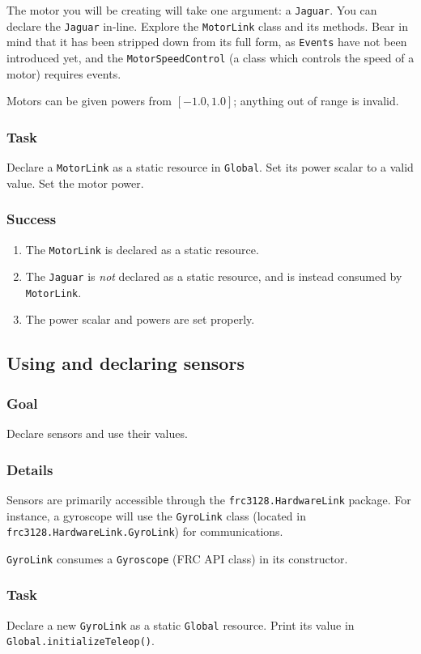 \documentclass[a4paper]{article}
\begin{document}
The motor you will be creating will take one argument: a \lstinline{Jaguar}. You can declare the \lstinline{Jaguar} in-line. Explore the \lstinline{MotorLink} class and its methods. Bear in mind that it has been stripped down from its full form, as \lstinline{Events} have not been introduced yet, and the \lstinline{MotorSpeedControl} (a class which controls the speed of a motor) requires events.

Motors can be given powers from $[-1.0,1.0]$; anything out of range is invalid.
\subsubsection{Task} Declare a \lstinline{MotorLink} as a static resource in \lstinline{Global}. Set its power scalar to a valid value. Set the motor power.
\subsubsection{Success} \begin{enumerate}\item{The \lstinline{MotorLink} is declared as a static resource.}\item{The \lstinline{Jaguar} is \textit{not} declared as a static resource, and is instead consumed by \lstinline{MotorLink}.}\item{The power scalar and powers are set properly.}\end{enumerate}

\pagebreak\subsection{Using and declaring sensors}
\subsubsection{Goal} Declare sensors and use their values.
\subsubsection{Details} Sensors are primarily accessible through the \lstinline{frc3128.HardwareLink} package. For instance, a gyroscope will use the \lstinline{GyroLink} class (located in \lstinline{frc3128.HardwareLink.GyroLink}) for communications. 

\lstinline{GyroLink} consumes a \lstinline{Gyroscope} (FRC API class) in its constructor.
\subsubsection{Task} Declare a new \lstinline{GyroLink} as a static \lstinline{Global} resource. Print its value in \lstinline{Global.initializeTeleop()}.
\end{document}
